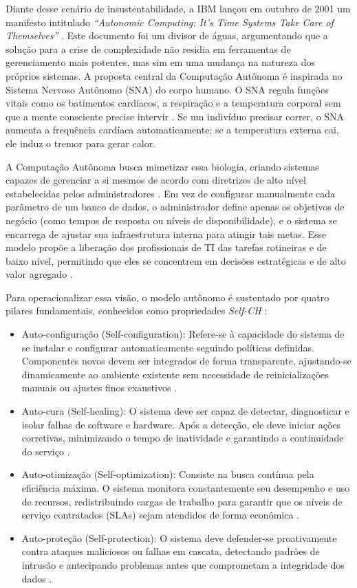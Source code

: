 Diante desse cenário de insustentabilidade, a IBM lançou em outubro de 2001 um manifesto intitulado \textit{``Autonomic Computing: It’s Time Systems Take Care of Themselves''} \cite{ibm2001}. Este documento foi um divisor de águas, argumentando que a solução para a crise de complexidade não residia em ferramentas de gerenciamento mais potentes, mas sim em uma mudança na natureza dos próprios sistemas. A proposta central da Computação Autônoma é inspirada no Sistema Nervoso Autônomo (SNA) do corpo humano. O SNA regula funções vitais como os batimentos cardíacos, a respiração e a temperatura corporal sem que a mente consciente precise intervir \cite{sterritt2005}. Se um indivíduo precisar correr, o SNA aumenta a frequência cardíaca automaticamente; se a temperatura externa cai, ele induz o tremor para gerar calor.

A Computação Autônoma busca mimetizar essa biologia, criando sistemas capazes de gerenciar a si mesmos de acordo com diretrizes de alto nível estabelecidas pelos administradores \cite{correa2007}. Em vez de configurar manualmente cada parâmetro de um banco de dados, o administrador define apenas os objetivos de negócio (como tempos de resposta ou níveis de disponibilidade), e o sistema se encarrega de ajustar sua infraestrutura interna para atingir tais metas. Esse modelo propõe a liberação dos profissionais de TI das tarefas rotineiras e de baixo nível, permitindo que eles se concentrem em decisões estratégicas e de alto valor agregado \cite{kephart2003}.

Para operacionalizar essa visão, o modelo autônomo é sustentado por quatro pilares fundamentais, conhecidos como propriedades \textit{Self-CH} \cite{ibm2001, sterritt2005}:

\begin{itemize}
	\item Auto-configuração (Self-configuration): Refere-se à capacidade do sistema de se instalar e configurar automaticamente seguindo políticas definidas. Componentes novos devem ser integrados de forma transparente, ajustando-se dinamicamente ao ambiente existente sem necessidade de reinicializações manuais ou ajustes finos exaustivos \cite{kephart2003}.
	\item Auto-cura (Self-healing): O sistema deve ser capaz de detectar, diagnosticar e isolar falhas de software e hardware. Após a detecção, ele deve iniciar ações corretivas, minimizando o tempo de inatividade e garantindo a continuidade do serviço \cite{correa2007}.
	\item Auto-otimização (Self-optimization): Consiste na busca contínua pela eficiência máxima. O sistema monitora constantemente seu desempenho e uso de recursos, redistribuindo cargas de trabalho para garantir que os níveis de serviço contratados (SLAs) sejam atendidos de forma econômica \cite{sterritt2005}.
	\item Auto-proteção (Self-protection): O sistema deve defender-se proativamente contra ataques maliciosos ou falhas em cascata, detectando padrões de intrusão e antecipando problemas antes que comprometam a integridade dos dados \cite{ibm2001}.
\end{itemize}

